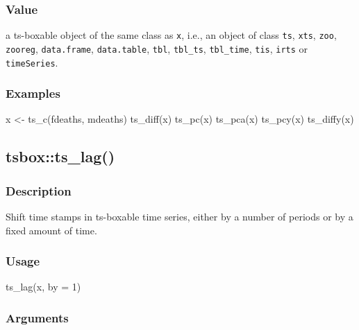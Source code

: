 \documentclass[
  letterpaper,
  DIV=11,
  numbers=noendperiod]{scrreport}
\newenvironment{Shaded}{\begin{snugshade}}{\end{snugshade}}
\newcommand{\AttributeTok}[1]{\textcolor[rgb]{0.40,0.45,0.13}{#1}}
\newcommand{\DecValTok}[1]{\textcolor[rgb]{0.68,0.00,0.00}{#1}}
\newcommand{\FunctionTok}[1]{\textcolor[rgb]{0.28,0.35,0.67}{#1}}
\newcommand{\NormalTok}[1]{\textcolor[rgb]{0.00,0.23,0.31}{#1}}
\newcommand{\OtherTok}[1]{\textcolor[rgb]{0.00,0.23,0.31}{#1}}
\begin{document}
\subsubsection{Value}\label{value-29}

a ts-boxable object of the same class as \texttt{x}, i.e., an object of
class \texttt{ts}, \texttt{xts}, \texttt{zoo}, \texttt{zooreg},
\texttt{data.frame}, \texttt{data.table}, \texttt{tbl},
\texttt{tbl\_ts}, \texttt{tbl\_time}, \texttt{tis}, \texttt{irts} or
\texttt{timeSeries}.

\subsubsection{Examples}\label{examples-29}

\begin{Shaded}
\begin{Highlighting}[]
\NormalTok{x }\OtherTok{\textless{}{-}} \FunctionTok{ts\_c}\NormalTok{(fdeaths, mdeaths)}
\FunctionTok{ts\_diff}\NormalTok{(x)}
\FunctionTok{ts\_pc}\NormalTok{(x)}
\FunctionTok{ts\_pca}\NormalTok{(x)}
\FunctionTok{ts\_pcy}\NormalTok{(x)}
\FunctionTok{ts\_diffy}\NormalTok{(x)}
\end{Highlighting}
\end{Shaded}

\subsection{tsbox::ts\_lag()}\label{tsboxts_lag}

\subsubsection{Description}\label{description-30}

Shift time stamps in ts-boxable time series, either by a number of
periods or by a fixed amount of time.

\subsubsection{Usage}\label{usage-30}

\begin{Shaded}
\begin{Highlighting}[]
\FunctionTok{ts\_lag}\NormalTok{(x, }\AttributeTok{by =} \DecValTok{1}\NormalTok{)}
\end{Highlighting}
\end{Shaded}

\subsubsection{Arguments}\label{arguments-30}
\end{document}
